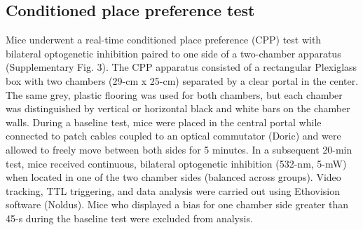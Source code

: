 \subsection{Conditioned place preference test}
\label{sec:ap1:m6}
Mice underwent a real-time conditioned place preference (CPP) test with bilateral optogenetic inhibition paired to one side of a two-chamber apparatus (Supplementary Fig. 3). The CPP apparatus consisted of a rectangular Plexiglass box with two chambers (29-cm x 25-cm) separated by a clear portal in the center. The same grey, plastic flooring was used for both chambers, but each chamber was distinguished by vertical or horizontal black and white bars on the chamber walls. During a baseline test, mice were placed in the central portal while connected to patch cables coupled to an optical commutator (Doric) and were allowed to freely move between both sides for 5 minutes. In a subsequent 20-min test, mice received continuous, bilateral optogenetic inhibition (532-nm, 5-mW) when located in one of the two chamber sides (balanced across groups). Video tracking, TTL triggering, and data analysis were carried out using Ethovision software (Noldus). Mice who displayed a bias for one chamber side greater than 45-s during the baseline test were excluded from analysis.